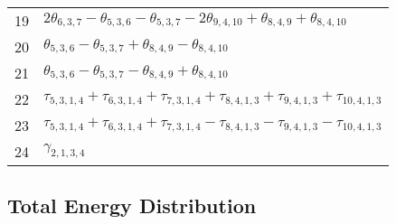 \documentclass[10pt,oneside]{article}
\begin{document}
\begin{table}[h!]
\begin{tabular}{ll}
  19  & $2\theta_{6,3,7} - \theta_{5,3,6} - \theta_{5,3,7} - 2\theta_{9,4,10} + \theta_{8,4,9} + \theta_{8,4,10}$ \\
  20  & $\theta_{5,3,6} - \theta_{5,3,7} + \theta_{8,4,9} - \theta_{8,4,10}$ \\
  21  & $\theta_{5,3,6} - \theta_{5,3,7} - \theta_{8,4,9} + \theta_{8,4,10}$ \\
  22  & $\tau_{5,3,1,4} + \tau_{6,3,1,4} + \tau_{7,3,1,4} + \tau_{8,4,1,3} + \tau_{9,4,1,3} + \tau_{10,4,1,3}$ \\
  23  & $\tau_{5,3,1,4} + \tau_{6,3,1,4} + \tau_{7,3,1,4} - \tau_{8,4,1,3} - \tau_{9,4,1,3} - \tau_{10,4,1,3}$ \\
  24  & $\gamma_{2,1,3,4}$ \\
\bottomrule
\end{tabular}
\end{table}

\begin{table}
\subsection*{Total Energy Distribution}
\centering\end{table}

\clearpage

\subsection{}
\end{document}
